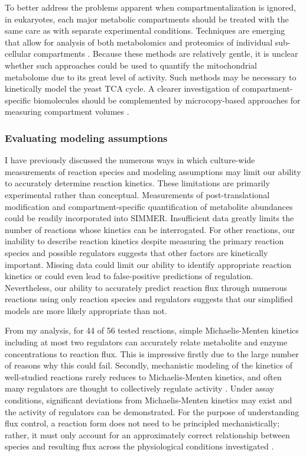 To better address the problems apparent when compartmentalization is ignored, in eukaryotes, each major metabolic compartments should be treated with the same care as with separate experimental conditions. Techniques are emerging that allow for analysis of both metabolomics and proteomics of individual sub-cellular compartments \cite{Klie:2011kq, Wuhr:2014fr}. Because these methods are relatively gentle, it is unclear whether such approaches could be used to quantify the mitochondrial metabolome due to its great level of activity. Such methods may be necessary to kinetically model the yeast TCA cycle. A clearer investigation of compartment-specific biomolecules should be complemented by microcopy-based approaches for measuring compartment volumes \cite{JENSEN:1993bz, Ghaemmaghami:2003ds}.

\subsubsection{Evaluating modeling assumptions}

I have previously discussed the numerous ways in which culture-wide measurements of reaction species and modeling assumptions may limit our ability to accurately determine reaction kinetics. These limitations are primarily experimental rather than conceptual. Measurements of post-translational modification and compartment-specific quantification of metabolite abundances could be readily incorporated into SIMMER. Insufficient data greatly limits the number of reactions whose kinetics can be interrogated. For other reactions, our inability to describe reaction kinetics despite measuring the primary reaction species  and possible regulators suggests that other factors are kinetically important. Missing data could limit our ability to identify appropriate reaction kinetics or could even lead to false-positive predictions of regulation. Nevertheless, our ability to accurately predict reaction flux through numerous reactions using only reaction species and regulators suggests that our simplified models are more likely appropriate than not.

From my analysis, for 44 of 56 tested reactions, simple Michaelis-Menten kinetics including at most two regulators can accurately relate metabolite and enzyme concentrations to reaction flux. This is impressive firstly due to the large number of reasons why this could fail. Secondly, mechanistic modeling of the kinetics of well-studied reactions rarely reduces to Michaelis-Menten kinetics, and often many regulators are thought to collectively regulate activity \cite{Hill:1977vm}.  Under assay conditions, significant deviations from Michaelis-Menten kinetics may exist and the activity of regulators can be demonstrated. For the purpose of understanding flux control, a reaction form does not need to be principled mechanistically; rather, it must only account for an approximately correct relationship between species and resulting flux across the physiological conditions investigated \cite{Fell:1997wg}. 

